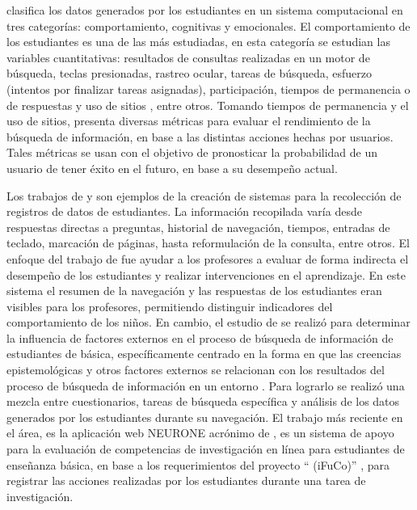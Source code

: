 \textcite{henrie2015measuring} clasifica los datos generados por los estudiantes en un sistema computacional en tres categorías: comportamiento, cognitivas y emocionales. El comportamiento de los estudiantes es una de las más estudiadas, en esta categoría se estudian las variables cuantitativas: resultados de consultas realizadas en un motor de búsqueda, teclas presionadas, rastreo ocular, tareas de búsqueda, esfuerzo (intentos por finalizar tareas asignadas), participación, tiempos de permanencia o de respuestas y uso de sitios , entre otros. Tomando tiempos de permanencia y el uso de sitios, \textcite{Shah2016} presenta diversas métricas para evaluar el rendimiento de la búsqueda de información, en base a las distintas acciones hechas por usuarios. Tales métricas se usan con el objetivo de pronosticar la probabilidad de un usuario de tener éxito en el futuro, en base a su desempeño actual. 

Los trabajos de \textcite{hwang2008novel} y \textcite{tu2008eighth} son ejemplos de la creación de sistemas para la recolección de registros de datos de estudiantes. La información recopilada varía desde respuestas directas a preguntas, historial de navegación, tiempos, entradas de teclado, marcación de páginas, hasta reformulación de la consulta, entre otros. El enfoque del trabajo de \textcite{hwang2008novel} fue ayudar a los profesores a evaluar de forma indirecta el desempeño de los estudiantes y realizar intervenciones en el aprendizaje. En este sistema el resumen de la navegación y las respuestas de los estudiantes eran visibles para los profesores, permitiendo distinguir indicadores del comportamiento  de los niños. En cambio, el estudio de \textcite{tu2008eighth} se realizó para determinar la influencia de factores externos en el proceso de búsqueda de información de estudiantes de básica, específicamente centrado en la forma en que las creencias epistemológicas y otros factores externos se relacionan con los resultados del proceso de búsqueda de información en un entorno . Para lograrlo se realizó una mezcla entre cuestionarios, tareas de búsqueda específica y análisis de los datos generados por los estudiantes durante su navegación. El trabajo más reciente en el área, es la aplicación web NEURONE \parencite{gonzalez2017neurone} acrónimo de , es un sistema de apoyo para la evaluación de competencias de investigación en línea para estudiantes de enseñanza básica, en base a los requerimientos del proyecto “ (iFuCo)” \parencite{sormen2017performance}, para registrar las acciones realizadas por los estudiantes durante una tarea de investigación. 

